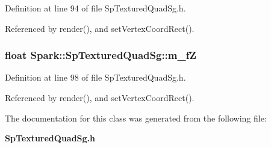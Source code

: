 Definition at line 94 of file Sp\-Textured\-Quad\-Sg.h.

Referenced by render(), and set\-Vertex\-Coord\-Rect().
\subsubsection{\setlength{\rightskip}{0pt plus 5cm}float {\bf Spark::Sp\-Textured\-Quad\-Sg::m\_\-f\-Z}\hspace{0.3cm}{\tt  [protected]}}\label{classSpark_1_1SpTexturedQuadSg_p4}


Definition at line 98 of file Sp\-Textured\-Quad\-Sg.h.

Referenced by render(), and set\-Vertex\-Coord\-Rect().

The documentation for this class was generated from the following file:\begin{CompactItemize}
\item 
{\bf Sp\-Textured\-Quad\-Sg.h}\end{CompactItemize}
